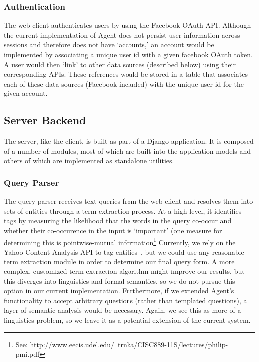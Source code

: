 \subsubsection{Authentication}
The web client authenticates users by using the Facebook OAuth API. Although the
current implementation of Agent does not persist user information across
sessions and therefore does not have `accounts,' an account would be implemented
by associating a unique user id with a given facebook OAuth token. A user would
then `link' to other data sources (described below) using their corresponding
APIs. These references would be stored in a table that associates each of these
data sources (Facebook included) with the unique user id for the given account.

\subsection{Server Backend}
The server, like the client, is built as part of a Django application. It is
composed of a number of modules, most of which are built into the application
models and others of which are implemented as standalone utilities.

\subsubsection{Query Parser}
\label{sec:query-parser}
The query parser receives text queries from the web client and resolves them
into sets of entities through a term extraction process. At a high level, it
identifies tags by measuring the likelihood that the words in the query co-occur
and whether their co-occurence in the input is `important' (one measure for
determining this is pointwise-mutual information\footnote{See:
http://www.eecis.udel.edu/~trnka/CISC889-11S/lectures/philip-pmi.pdf} Currently,
we rely on the Yahoo Content Analysis API to tag entities~\cite{yahoo_ca}, but
we could use any reasonable term extraction module in order to determine our
final query form. A more complex, customized term extraction algorithm might
improve our results, but this diverges into linguistics and formal semantics, so
we do not pursue this option in our current implementation.  Furthermore, if we
extended Agent's functionality to accept arbitrary questions (rather than
templated questions), a layer of semantic analysis would be necessary. Again, we
see this as more of a linguistics problem, so we leave it as a potential
extension of the current system.

